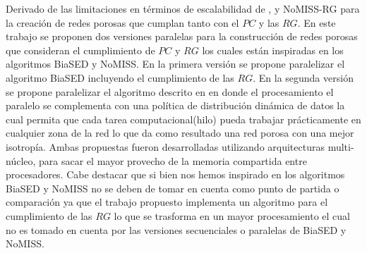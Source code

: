 Derivado de las limitaciones en términos de escalabilidad de \cite{ref5}, \cite{17} y NoMISS-RG para la creación de redes porosas que cumplan tanto con el $PC$ y las $RG$. En este trabajo se proponen dos versiones paralelas para la construcción de redes porosas que consideran el cumplimiento de $PC$ y $RG$ los cuales están inspiradas en los algoritmos BiaSED y NoMISS. En la primera versión se propone paralelizar el algoritmo BiaSED incluyendo el cumplimiento de las $RG$. En la segunda versión se propone paralelizar el algoritmo descrito en \cite{ref17} en donde el procesamiento el paralelo se complementa con una política de distribución dinámica de datos la cual permita que cada tarea computacional(hilo) pueda trabajar prácticamente en cualquier zona de la red lo que da como resultado una red porosa con una mejor isotropía. Ambas propuestas fueron desarrolladas utilizando arquitecturas multi-núcleo, para sacar el mayor provecho de la memoria compartida entre procesadores. Cabe destacar que si bien nos hemos inspirado en los algoritmos  BiaSED y  NoMISS no se deben de tomar en cuenta como punto de partida o comparación ya que el trabajo propuesto implementa un algoritmo para el cumplimiento de las $RG$ lo que se trasforma en un mayor procesamiento el cual no es tomado en cuenta por las versiones secuenciales o paralelas de BiaSED y NoMISS.





